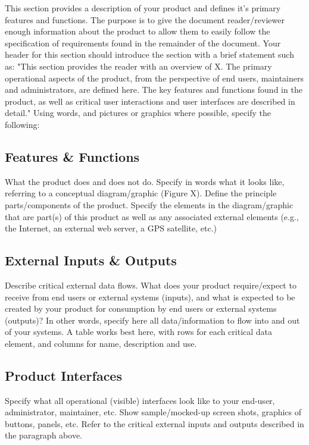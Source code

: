 This section provides a description of your product and defines it's primary features and functions. 
The purpose is to give the document reader/reviewer enough information about the product to allow them to easily 
follow the specification of requirements found in the remainder of the document. Your header for this section 
should introduce the section with a brief statement such as: "This section provides the reader with an overview 
of X. The primary operational aspects of the product, from the perspective of end users, maintainers and 
administrators, are defined here. The key features and functions found in the product, as well as critical 
user interactions and user interfaces are described in detail." Using words, and pictures or graphics where 
possible, specify the following:

\subsection{Features \& Functions}
What the product does and does not do. Specify in words what it looks like, referring to a conceptual 
diagram/graphic (Figure X).  Define the principle parts/components of the product. Specify the elements 
in the diagram/graphic that are part(s) of this product as well as any associated external elements 
(e.g., the Internet, an external web server, a GPS satellite, etc.)

\subsection{External Inputs \& Outputs}
Describe critical external data flows. What does your product require/expect to receive from end users or 
external systems (inputs), and what is expected to be created by your product for consumption by end users 
or external systems (outputs)? In other words, specify here all data/information to flow into and out of your 
systems. A table works best here, with rows for each critical data element, and columns for name, description 
and use.

\subsection{Product Interfaces}
Specify what all operational (visible) interfaces look like to your end-user, administrator, maintainer, etc. 
Show sample/mocked-up screen shots, graphics of buttons, panels, etc. Refer to the critical external inputs and 
outputs described in the paragraph above.
